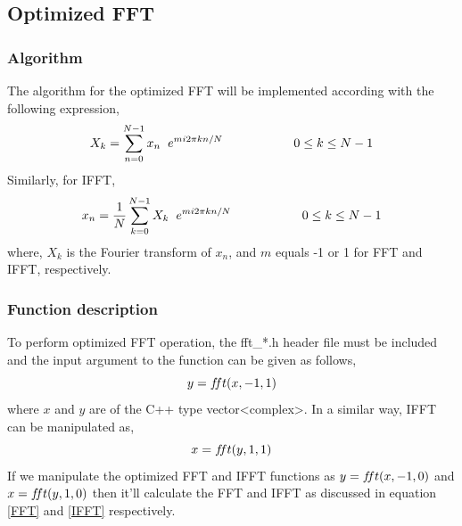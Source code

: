 \begin{refsection}
\section*{Optimized FFT}
\subsubsection{Algorithm}
The algorithm for the optimized FFT will be implemented according with the following expression,
\begin{equation}
X_k =\sum\limits_{n=0}^{N-1} x_n \hspace{2mm} e^{mi2\pi kn/N}		\hspace{2cm}	0\leq k \leq N-1
\label{optimized_FFT}
\end{equation}
Similarly, for IFFT,
\begin{equation}
x_n =\frac{1}{N} \sum\limits_{k=0}^{N-1} X_k \hspace{2mm}  e^{mi2\pi kn/N}		\hspace{2cm}	0\leq k \leq N-1
\label{optimized_IFFT}
\end{equation}
where, $X_k$ is the Fourier transform of $x_n$, and $m$ equals -1 or 1 for FFT and IFFT, respectively.

\subsubsection{Function description}
To perform optimized FFT operation, the fft\_*.h header file must be included and the input argument to the function can be given as follows,
\begin{equation*}
	y=f\hspace{-0.85mm}ft(x,-1,1)
\end{equation*}
where $x$ and $y$ are of the C++ type vector<complex>. In a similar way, IFFT can be manipulated as,
\begin{equation*}
	x=f\hspace{-0.85mm}ft(y,1,1)
\end{equation*}
If we manipulate the optimized FFT and IFFT functions as $y=f\hspace{-0.85mm}ft(x,-1,0)$ and  $x=f\hspace{-0.85mm}ft(y,1,0)$ then it'll calculate the FFT and IFFT as discussed in equation \ref{FFT} and \ref{IFFT} respectively.

\end{refsection}
